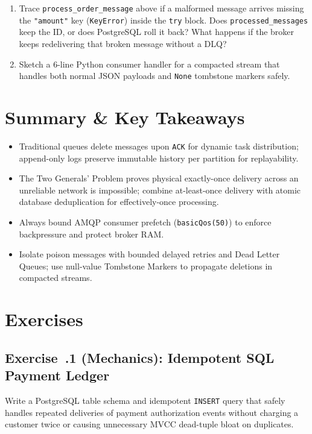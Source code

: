 \begin{tryityourselfbox}
\begin{enumerate}[leftmargin=18pt]
  \item Trace \texttt{process\_order\_message} above if a malformed message arrives missing the \texttt{"amount"} key (\texttt{KeyError}) inside the \texttt{try} block. Does \texttt{processed\_messages} keep the ID, or does PostgreSQL roll it back? What happens if the broker keeps redelivering that broken message without a DLQ?
  \item Sketch a 6-line Python consumer handler for a compacted stream that handles both normal JSON payloads and \texttt{None} tombstone markers safely.
\end{enumerate}
\end{tryityourselfbox}

\section{Summary \protect\& Key Takeaways}
\begin{itemize}[leftmargin=18pt]
  \item Traditional queues delete messages upon \texttt{ACK} for dynamic task distribution; append-only logs preserve immutable history per partition for replayability.
  \item The Two Generals' Problem proves physical exactly-once delivery across an unreliable network is impossible; combine at-least-once delivery with atomic database deduplication for effectively-once processing.
  \item Always bound AMQP consumer prefetch (\texttt{basicQos(50)}) to enforce backpressure and protect broker RAM.
  \item Isolate poison messages with bounded delayed retries and Dead Letter Queues; use null-value Tombstone Markers to propagate deletions in compacted streams.
\end{itemize}

\section{Exercises}

\subsection*{Exercise~\thechapter.1 (Mechanics): Idempotent SQL Payment Ledger}
Write a PostgreSQL table schema and idempotent \texttt{INSERT} query that safely handles repeated deliveries of payment authorization events without charging a customer twice or causing unnecessary MVCC dead-tuple bloat on duplicates.

